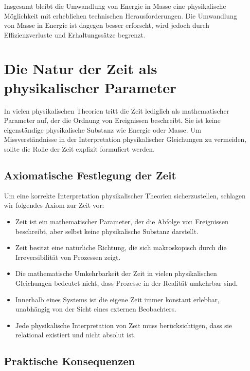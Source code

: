 \documentclass{article}
\begin{document}
	Insgesamt bleibt die Umwandlung von Energie in Masse eine physikalische Möglichkeit mit erheblichen technischen Herausforderungen. Die Umwandlung von Masse in Energie ist dagegen besser erforscht, wird jedoch durch Effizienzverluste und Erhaltungssätze begrenzt.
	
	
	\section{Die Natur der Zeit als physikalischer Parameter}
	
	In vielen physikalischen Theorien tritt die Zeit lediglich als mathematischer Parameter auf, der die Ordnung von Ereignissen beschreibt. Sie ist keine eigenständige physikalische Substanz wie Energie oder Masse. Um Missverständnisse in der Interpretation physikalischer Gleichungen zu vermeiden, sollte die Rolle der Zeit explizit formuliert werden.
	
	\subsection{Axiomatische Festlegung der Zeit}
	
	Um eine korrekte Interpretation physikalischer Theorien sicherzustellen, schlagen wir folgendes Axiom zur Zeit vor:
	
	\begin{itemize}
		\item Zeit ist ein mathematischer Parameter, der die Abfolge von Ereignissen beschreibt, aber selbst keine physikalische Substanz darstellt.
		\item Zeit besitzt eine natürliche Richtung, die sich makroskopisch durch die Irreversibilität von Prozessen zeigt.
		\item Die mathematische Umkehrbarkeit der Zeit in vielen physikalischen Gleichungen bedeutet nicht, dass Prozesse in der Realität umkehrbar sind.
		\item Innerhalb eines Systems ist die eigene Zeit immer konstant erlebbar, unabhängig von der Sicht eines externen Beobachters.
		\item Jede physikalische Interpretation von Zeit muss berücksichtigen, dass sie relational existiert und nicht absolut ist.
	\end{itemize}
	
	\subsection{Praktische Konsequenzen}
	
\end{document}
